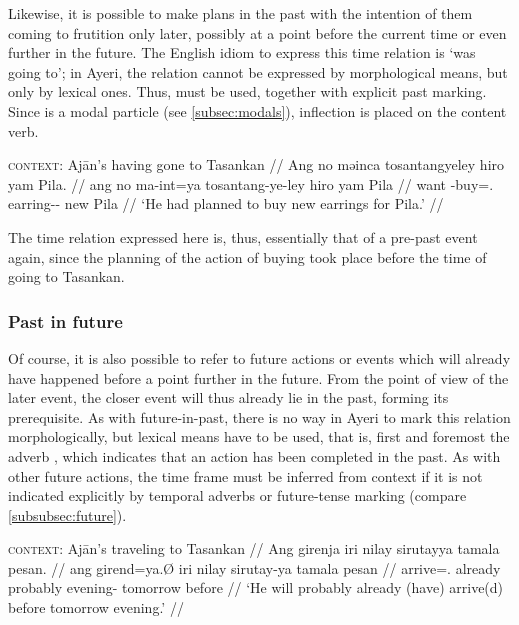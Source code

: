 Likewise, it is possible to make plans in the past with the intention of them 
coming to frutition only later, possibly at a point before the current time or 
even further in the future. The English idiom to express this time relation is 
`was going to'; in Ayeri, the relation cannot be expressed by morphological 
means, but only by lexical ones. Thus,  must 
be used, together with explicit past marking. Since  is a modal 
particle (see \autoref{subsec:modals}), inflection is placed on the content 
verb.

\ex
\begingl
	\glpreamble \textsc{context}: Ajān's having gone to Tasankan //
	\gla Ang no məinca tosantangyeley hiro yam Pila. //
	\glb ang no ma-int=ya tosantang-ye-ley hiro yam Pila //
	\glc \AgtT{} want \Pst{}-buy=\TsgM{}.\Top{} earring-\Pl{}-\PargI{} new 
		\Dat{} Pila //
	\glft `He had planned to buy new earrings for Pila.' //
\endgl
\xe

The time relation expressed here is, thus, essentially that of a pre-past 
event again, since the planning of the action of buying took place before 
the time of going to Tasankan.


\subsubsection{Past in future}

Of course, it is also possible to refer to future actions or events which will
already have happened before a point further in the future. From the point of
view of the later event, the closer event will thus already lie in the past,
forming its prerequisite. As with future-in-past, there is no way in Ayeri to
mark this relation morphologically, but lexical means have to be used, that is,
first and foremost the adverb , which indicates that an
action has been completed in the past. As with other future actions, the time
frame must be inferred from context if it is not indicated explicitly by
temporal adverbs or future-tense marking (compare
\autoref{subsubsec:future}).

\ex
\begingl
	\glpreamble \textsc{context}: Ajān's traveling to Tasankan //
	\gla Ang girenja iri nilay sirutayya tamala pesan. //
	\glb ang girend=ya.Ø iri nilay sirutay-ya tamala pesan //
	\glc \AgtT{} arrive=\TsgM{}.\Top{} already 
		probably evening-\Loc{} tomorrow before //
	\glft `He will probably already (have) arrive(d) before 
		tomorrow evening.' //
\endgl
\xe

